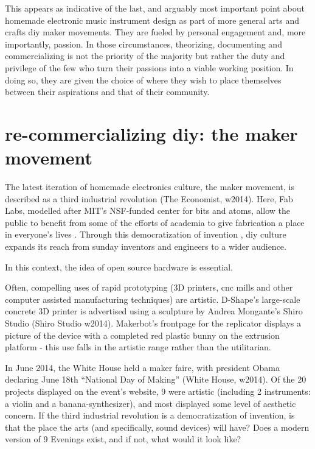 \begin{itemize}
This appears as indicative of the last, and arguably most important point about homemade electronic music instrument design as part of more general arts and crafts \/ diy \/ maker movements. They are fueled by personal engagement and, more importantly, passion. In those circumstances, theorizing, documenting and commercializing is not the priority of the majority but rather the duty and privilege of the few who turn their passions into a viable working position. In doing so, they are given the choice of where they wish to place themselves between their aspirations and that of their community. 

\section{re-commercializing diy: the maker movement}  

The latest iteration of homemade electronics culture, the maker movement, is described as a third industrial revolution (The Economist, w2014). Here, Fab Labs, modelled after MIT’s NSF-funded center for bits and atoms, allow the public to benefit from some of the efforts of academia to give fabrication a place in everyone’s lives \citep{padfield2014,blikstein2013}. Through this democratization of invention \citep{blikstein2013}, diy culture expands its reach from sunday inventors and engineers to a wider audience. 

In this context, the idea of open source hardware is essential. 

	Often, compelling uses of rapid prototyping (3D printers, cnc mills and other computer assisted manufacturing techniques) are artistic. D-Shape’s large-scale concrete 3D printer is advertised using a sculpture by Andrea Mongante’s Shiro Studio (Shiro Studio w2014). Makerbot’s frontpage for the replicator displays a picture of the device with a completed red plastic bunny on the extrusion platform - this use falls in the artistic range rather than the utilitarian. 

In June 2014, the White House held a maker faire, with president Obama declaring June 18th “National Day of Making” (White House, w2014). Of the 20 projects displayed on the event’s website, 9 were artistic (including 2 instruments: a violin and a banana-synthesizer), and most displayed some level of aesthetic concern. If the third industrial revolution is a democratization of invention, is that the place the arts (and specifically, sound devices) will have? Does a modern version of 9 Evenings exist, and if not, what would it look like? 


\end{itemize}
